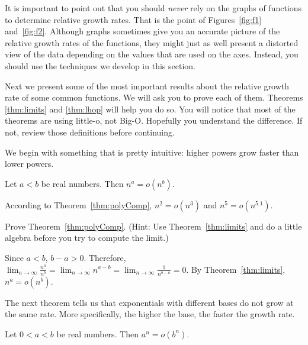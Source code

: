 It is important to point out that you should {\em never} rely on the graphs of functions
to determine relative growth rates.  That is the point of Figures~\ref{fig:f1} and~\ref{fig:f2}.
Although graphs sometimes give you an accurate picture of the relative growth rates of
the functions, they might just as well present a distorted view of the data 
depending on the values that are used on the axes.  Instead, you should use the
techniques we develop in this section.

Next we present some of the most important results about the relative growth rate of some 
common functions.  We will ask you to prove each of them. 
Theorems \ref{thm:limits} and \ref{thm:lhop} will help you do so.
You will notice that most of the theorems are using little-o, not Big-O.
Hopefully you understand the difference.  If not, review those definitions before
continuing.

We begin with something that is pretty intuitive: higher powers grow faster than lower powers.

\begin{thm}\label{thm:polyComp}
Let $a<b$ be real numbers.  Then 
$n^a=o(n^b)$.
\end{thm}

\begin{exa}
According to Theorem~\ref{thm:polyComp}, $n^2=o(n^3)$ and $n^5=o(n^{5.1})$.
\end{exa}

\begin{exer}\label{exer:polyComp}
Prove Theorem~\ref{thm:polyComp}.
(Hint: Use Theorem~\ref{thm:limits} 
and do a little algebra before you try to compute the limit.)

\vspace*{2in}
\begin{answer}
Since $a<b$, $b-a>0$.  
Therefore, $\displaystyle \lim_{n\rightarrow\infty} \frac{n^a}{n^b} 
=  \lim_{n\rightarrow\infty} n^{a-b} =  \lim_{n\rightarrow\infty} \frac{1}{n^{b-a}}=0$.
By Theorem~\ref{thm:limits}, $n^a=o(n^b)$.
\end{answer}
\end{exer}


The next theorem tells us that exponentials with different bases do not grow at the same rate.
More specifically, the higher the base, the faster the growth rate.

\begin{thm}\label{thm:expComp}
Let $0<a<b$ be real numbers.  Then 
$a^n=o(b^n)$.
\end{thm}

